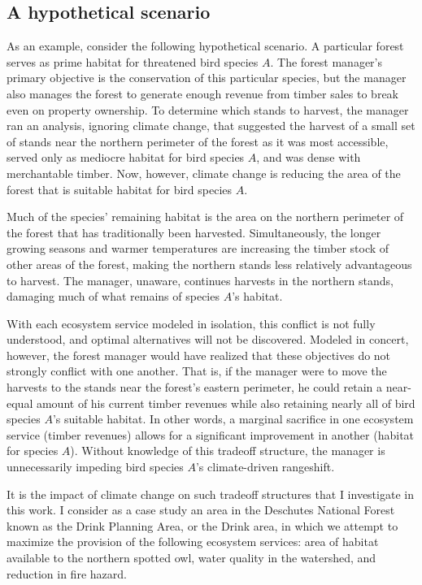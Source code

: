 \subsection{A hypothetical scenario}
As an example, consider the following hypothetical scenario. A particular forest serves as prime habitat for threatened bird species $A$. The forest manager's primary objective is the conservation of this particular species, but the manager also manages the forest to generate enough revenue from timber sales to break even on property ownership.  To determine which stands to harvest, the manager ran an analysis, ignoring climate change, that suggested the harvest of a small set of stands near the northern perimeter of the forest as it was most accessible, served only as mediocre habitat for bird species $A$, and was dense with merchantable timber. Now, however, climate change is reducing the area of the forest that is suitable habitat for bird species $A$.

Much of the species' remaining habitat is the area on the northern perimeter of the forest that has traditionally been harvested. Simultaneously, the longer growing seasons and warmer temperatures are increasing the timber stock of other areas of the forest, making the northern stands less relatively advantageous to harvest. The manager, unaware, continues harvests in the northern stands, damaging much of what remains of species $A$'s habitat.

With each ecosystem service modeled in isolation, this conflict is not fully understood, and optimal alternatives will not be discovered. Modeled in concert, however, the forest manager would have realized that these objectives do not strongly conflict with one another. That is, if the manager were to move the harvests to the stands near the forest's eastern perimeter, he could retain a near-equal amount of his current timber revenues while also retaining nearly all of bird species $A$'s suitable habitat. In other words, a marginal sacrifice in one ecosystem service (timber revenues) allows for a significant improvement in another (habitat for species $A$). Without knowledge of this tradeoff structure, the manager is unnecessarily impeding bird species $A$'s climate-driven rangeshift.

It is the impact of climate change on such tradeoff structures that I investigate in this work. I consider as a case study an area in the Deschutes National Forest known as the Drink Planning Area, or the Drink area, in which we attempt to maximize the provision of the following ecosystem services: area of habitat available to the northern spotted owl, water quality in the watershed, and reduction in fire hazard.
